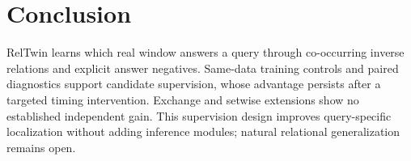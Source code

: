 \section{Conclusion}
RelTwin learns which real window answers a query through co-occurring inverse relations and explicit answer negatives. Same-data training controls and paired diagnostics support candidate supervision, whose advantage persists after a targeted timing intervention. Exchange and setwise extensions show no established independent gain. This supervision design improves query-specific localization without adding inference modules; natural relational generalization remains open.
